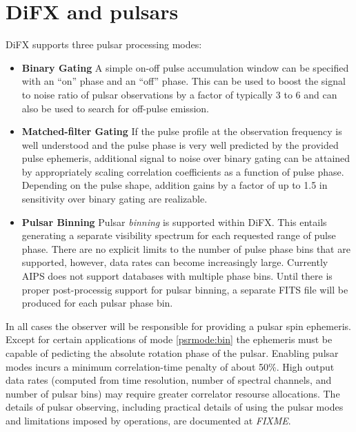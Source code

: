 \section{DiFX and pulsars} \label{sec:pulsars}

DiFX supports three pulsar processing modes:

\begin{itemize}

\item \label{psrmode:binarygate} {\bf Binary Gating}  
A simple on-off pulse accumulation window can be specified with an ``on'' phase and an ``off'' phase.
This can be used to boost the signal to noise ratio of pulsar observations by a factor of typically 3 to 6 and can also be used to search for off-pulse emission.

\item \label{psrmode:matchedgate} {\bf Matched-filter Gating}
If the pulse profile at the observation frequency is well understood and the pulse phase is very well predicted by the provided pulse ephemeris, additional signal to noise over binary gating can be attained by appropriately scaling correlation coefficients as a function of pulse phase.
Depending on the pulse shape, addition gains by a factor of up to 1.5 in sensitivity over binary gating are realizable.

\item \label{psrmode:bin} {\bf Pulsar Binning}
Pulsar {\em binning} is supported within DiFX.
This entails generating a separate visibility spectrum for each requested range of pulse phase.
There are no explicit limits to the number of pulse phase bins that are supported, however, data rates can become increasingly large.
Currently AIPS does not support databases with multiple phase bins. 
Until there is proper post-processig support for pulsar binning, a separate FITS file will be produced for each pulsar phase bin.

\end{itemize}

In all cases the observer will be responsible for providing a pulsar
spin ephemeris.  Except for certain applications of mode 
\ref{psrmode:bin} the ephemeris must be capable of pedicting the absolute
rotation phase of the pulsar.
Enabling pulsar modes incurs a minimum correlation-time penalty of
about 50\%.  High output data rates (computed from time resolution,
number of spectral channels, and number of pulsar bins) may require 
greater correlator resourse allocations.
The details of pulsar observing, including practical details of using
the pulsar modes and limitations imposed by operations, 
are documented at {\em FIXME}.

